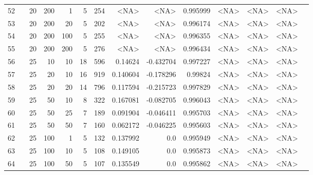 \begin{longtable}{llrrrrrrrrrrrr}
		52  & &           20 &               200 &            1 &              5 &        254 &      <NA> &      <NA> &  0.995999 &        <NA> &           <NA> &      <NA> \\
		53  & &           20 &               200 &           20 &              5 &        202 &      <NA> &      <NA> &  0.996174 &        <NA> &           <NA> &      <NA> \\
		54  & &           20 &               200 &          100 &              5 &        255 &      <NA> &      <NA> &  0.996355 &        <NA> &           <NA> &      <NA> \\
		55  & &           20 &               200 &          200 &              5 &        276 &      <NA> &      <NA> &  0.996434 &        <NA> &           <NA> &      <NA> \\
		56  & &           25 &                10 &           10 &          18 &        596 &   0.14624 & -0.432704 &  0.997227 &        <NA> &           <NA> &      <NA> \\
		57  & &           25 &                20 &           10 &          16 &        919 &  0.140604 & -0.178296 &   0.99824 &        <NA> &           <NA> &      <NA> \\
		58  & &           25 &                20 &           20 &          14 &        796 &  0.117594 & -0.215723 &  0.997829 &        <NA> &           <NA> &      <NA> \\
		59  & &           25 &                50 &           10 &           8 &        322 &  0.167081 & -0.082705 &  0.996043 &        <NA> &           <NA> &      <NA> \\
		60  & &           25 &                50 &           25 &           7 &        189 &  0.091904 & -0.046411 &  0.995703 &        <NA> &           <NA> &      <NA> \\
		61  & &           25 &                50 &           50 &           7 &        160 &  0.062172 & -0.046225 &  0.995603 &        <NA> &           <NA> &      <NA> \\
		62  & &           25 &               100 &            1 &           5 &        132 &  0.137992 &       0.0 &  0.995949 &        <NA> &           <NA> &      <NA> \\
		63  & &           25 &               100 &           10 &           5 &        108 &  0.149105 &       0.0 &  0.995873 &        <NA> &           <NA> &      <NA> \\
		64  & &           25 &               100 &           50 &           5 &        107 &  0.135549 &       0.0 &  0.995862 &        <NA> &           <NA> &      <NA> \\

\end{longtable}
